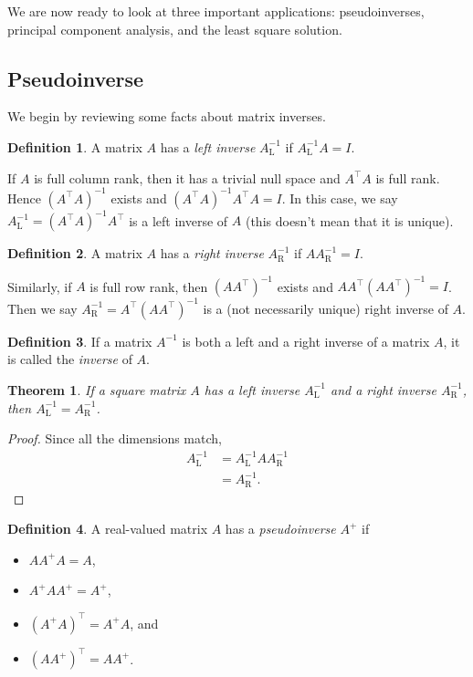 \documentclass[]{article}
\theoremstyle{plain}
\newtheorem{thm}{Theorem}
\theoremstyle{definition}
\newtheorem{defn}{Definition}
\theoremstyle{remark}
\begin{document}
We are now ready to look at three important applications:  pseudoinverses,
principal component analysis, and the least square solution.

\subsection{Pseudoinverse}\label{pseudoinverse}

We begin by reviewing some facts about matrix inverses.

\begin{defn}
A matrix $A$ has a \emph{left inverse} $A_\text{L}^{-1}$ if $A_\text{L}^{-1}A=I$.
\end{defn}

If $A$ is full column rank, then it has a trivial null space and $A^\top A$ is
full rank.  Hence $(A^\top A)^{-1}$ exists and $(A^\top A)^{-1}A^\top A = I$.
In this case, we say $A_\text{L}^{-1} = (A^\top A)^{-1}A^\top$ is a left
inverse of $A$ (this doesn't mean that it is unique).

\begin{defn}
A matrix $A$ has a \emph{right inverse} $A_\text{R}^{-1}$ if $AA_\text{R}^{-1}=I$.
\end{defn}

Similarly, if $A$ is full row rank, then  $(AA^\top)^{-1}$ exists and
$AA^\top(A A^\top)^{-1} = I$. Then we say $A_\text{R}^{-1} = A^\top(A A^\top)^{-1}$
is a (not necessarily unique) right inverse of $A$.

\begin{defn}
If a matrix $A^{-1}$ is both a left and a right inverse of a matrix $A$, it is
called the \emph{inverse} of $A$.
\end{defn}

\begin{thm}
If a square matrix $A$ has a left inverse $A_\text{L}^{-1}$ and a right inverse
$A_\text{R}^{-1}$, then $A_\text{L}^{-1}=A_\text{R}^{-1}$.
\end{thm}
\begin{proof}
Since all the dimensions match,
\begin{align*}
A_\text{L}^{-1} &= A_\text{L}^{-1}AA_\text{R}^{-1} \\
  &= A_\text{R}^{-1}.
\end{align*}
\end{proof}

\begin{defn}
A real-valued matrix $A$ has a \emph{pseudoinverse} $A^+$ if
\begin{itemize}
\item $AA^+A = A$,
\item $A^+AA^+ = A^+$,
\item $(A^+A)^\top = A^+A$, and
\item $(AA^+)^\top = AA^+$.
\end{itemize}
\end{defn}
\end{document}
